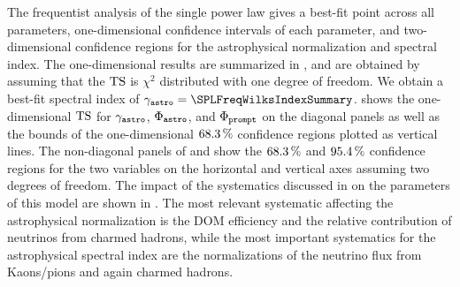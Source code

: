 The frequentist analysis of the single power law gives a best-fit point across all parameters, one-dimensional confidence intervals of each parameter, and two-dimensional confidence regions for the astrophysical normalization and spectral index.
The one-dimensional results are summarized in , and are obtained by assuming that the $\mathrm{TS}$ is $\chi^2$ distributed with one degree of freedom.
We obtain a best-fit spectral index of $\astrodeltagamma=\SPLFreqWilksIndexSummary$.
 shows the one-dimensional $\mathrm{TS}$ for $\gamma_\texttt{astro}$, $\Phi_\texttt{astro}$, and $\Phi_\texttt{prompt}$ on the diagonal panels as well as the bounds of the one-dimensional $\SI{68.3}\percent$ confidence regions plotted as vertical lines.
The non-diagonal panels of  and  show the $\SI{68.3}\percent$ and $\SI{95.4}\percent$ confidence regions for the two variables on the horizontal and vertical axes assuming two degrees of freedom.
The impact of the systematics discussed in  on the parameters of this model are shown in .
The most relevant systematic affecting the astrophysical normalization is the DOM efficiency and the relative contribution of neutrinos from charmed hadrons, while the most important systematics for the astrophysical spectral index are the normalizations of the neutrino flux from Kaons/pions and again charmed hadrons.

